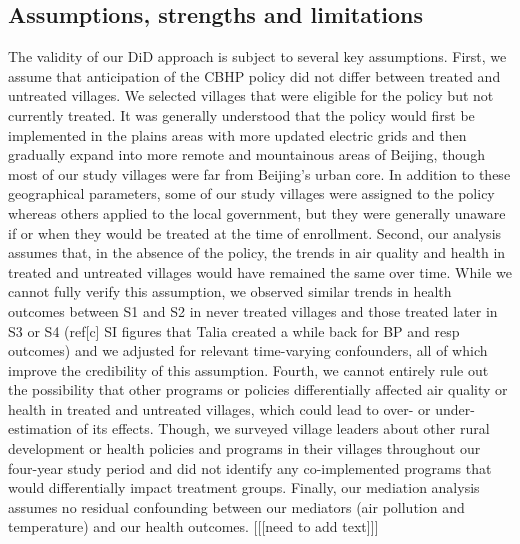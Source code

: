 \documentclass[
  letterpaper,
  DIV=11,
  numbers=noendperiod]{scrartcl}
\begin{document}
\hypertarget{assumptions-strengths-and-limitations}{%
\subsection{Assumptions, strengths and
limitations}\label{assumptions-strengths-and-limitations}}

The validity of our DiD approach is subject to several key assumptions.
First, we assume that anticipation of the CBHP policy did not differ
between treated and untreated villages. We selected villages that were
eligible for the policy but not currently treated. It was generally
understood that the policy would first be implemented in the plains
areas with more updated electric grids and then gradually expand into
more remote and mountainous areas of Beijing, though most of our study
villages were far from Beijing's urban core. In addition to these
geographical parameters, some of our study villages were assigned to the
policy whereas others applied to the local government, but they were
generally unaware if or when they would be treated at the time of
enrollment. Second, our analysis assumes that, in the absence of the
policy, the trends in air quality and health in treated and untreated
villages would have remained the same over time. While we cannot fully
verify this assumption, we observed similar trends in health outcomes
between S1 and S2 in never treated villages and those treated later in
S3 or S4 (ref{[}c{]} SI figures that Talia created a while back for BP
and resp outcomes) and we adjusted for relevant time-varying
confounders, all of which improve the credibility of this assumption.
Fourth, we cannot entirely rule out the possibility that other programs
or policies differentially affected air quality or health in treated and
untreated villages, which could lead to over- or under-estimation of its
effects. Though, we surveyed village leaders about other rural
development or health policies and programs in their villages throughout
our four-year study period and did not identify any co-implemented
programs that would differentially impact treatment groups. Finally, our
mediation analysis assumes no residual confounding between our mediators
(air pollution and temperature) and our health outcomes. {[}{[}{[}need
to add text{]}{]}{]}
\end{document}
